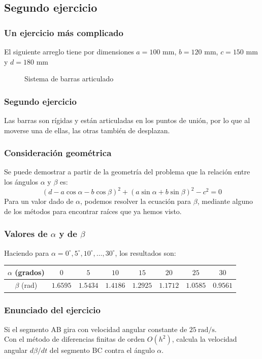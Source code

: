 \subsection*{Segundo ejercicio}
\begin{frame}
\frametitle{Un ejercicio más complicado}
El siguiente arreglo tiene por dimensiones $a=100$ mm, $b=120$ mm, $c=150$ mm y $d=180$ mm
\begin{figure}
	\centering
	
	\caption{Sistema de barras articulado}
\end{figure}
\end{frame}
\begin{frame}
\frametitle{Segundo ejercicio}
\begin{figure}
  \centering
  
\end{figure}
Las barras son rígidas y están articuladas en los puntos de unión, por lo que al moverse una de ellas, las otras también de desplazan.
\end{frame}
\begin{frame}
\frametitle{Consideración geométrica}
Se puede demostrar a partir de la geometría del problema que la relación entre los ángulos $\alpha$ y $\beta$ es:
\[ (d - a \cos \alpha - b \cos \beta)^{2} + (a \sin \alpha + b \sin \beta)^{2} - c^{2} = 0\]
\pause
Para un valor dado de $\alpha$, podemos resolver la ecuación para $\beta$, mediante alguno de los métodos para encontrar raíces que ya hemos visto. 
\end{frame}
\begin{frame}
\frametitle{Valores de $\alpha$ y de $\beta$}
Haciendo para $\alpha=0^{\circ}, 5^{\circ}, 10^{\circ},\ldots, 30^{\circ}$, los resultados son:
\begin{center}
\fontsize{10}{10}\selectfont
\begin{tabular}{c | c | c | c | c | c | c | c}
$\alpha$ (grados) & $0$ & $5$ & $10$ & $15$ & $20$ & $25$ & $30$  \\ \hline
$\beta$ (rad) & $1.6595$ & $1.5434$ & $1.4186$ & $1.2925$ & $1.1712$ & $1.0585$ & $0.9561$
\end{tabular}
\end{center}
\end{frame}
\begin{frame}
\frametitle{Enunciado del ejercicio}
Si el segmento AB gira con velocidad angular constante de $\SI{25}{\radian\per\second}$.
\\
\bigskip
Con el método de diferencias finitas de orden $O(h^{2})$, calcula la velocidad angular $d\beta / dt$ del segmento BC contra el ángulo $\alpha$.
\end{frame}
